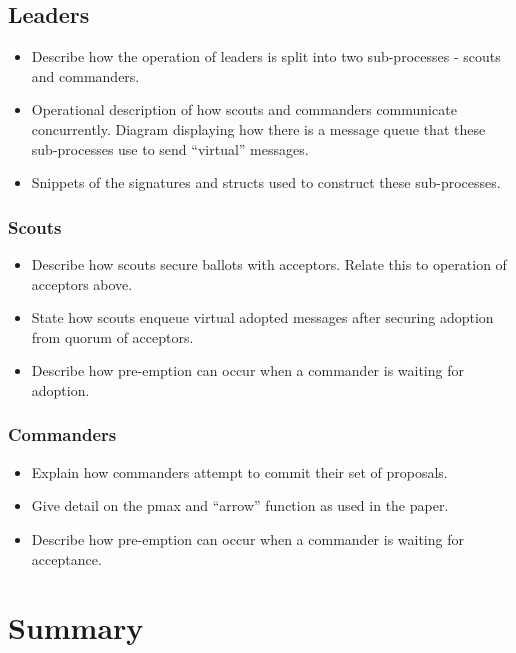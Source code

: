 \subsection{Leaders}
\begin{itemize}
  \item Describe how the operation of leaders is split into two sub-processes - scouts and commanders.
  \item Operational description of how scouts and commanders communicate concurrently. Diagram displaying how there is a message queue that these sub-processes use to send ``virtual'' messages.
  \item Snippets of the signatures and structs used to construct these sub-processes. 
\end{itemize}

\subsubsection{Scouts}
\begin{itemize}
  \item Describe how scouts secure ballots with acceptors. Relate this to operation of acceptors above.
  \item State how scouts enqueue virtual adopted messages after securing adoption from quorum of acceptors.
  \item Describe how pre-emption can occur when a commander is waiting for adoption.
\end{itemize}

\subsubsection{Commanders}
\begin{itemize}
  \item Explain how commanders attempt to commit their set of proposals.
  \item Give detail on the pmax and ``arrow'' function as used in the paper.
  \item Describe how pre-emption can occur when a commander is waiting for acceptance.
\end{itemize}

\section{Summary}
